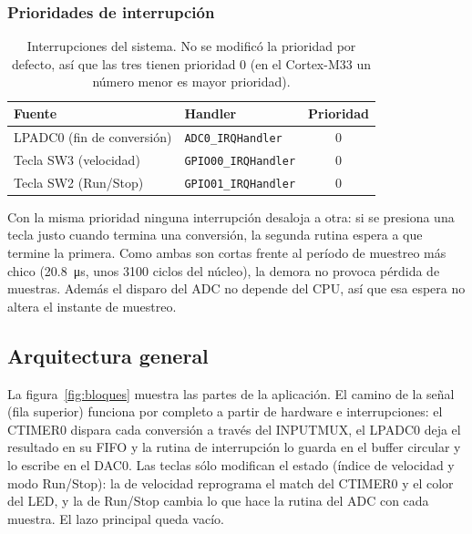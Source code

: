 \documentclass[11pt,a4paper]{article}
\begin{document}
\subsubsection{Prioridades de interrupción}

\begin{table}[H]
\centering
\caption{Interrupciones del sistema. No se modificó la prioridad por defecto,
así que las tres tienen prioridad 0 (en el Cortex-M33 un número menor es
mayor prioridad).}
\label{tab:nvic}
\begin{tabular}{@{}l l c@{}}
\toprule
\textbf{Fuente} & \textbf{Handler} & \textbf{Prioridad}\\
\midrule
LPADC0 (fin de conversión) & \texttt{ADC0\_IRQHandler}      & 0\\
Tecla SW3 (velocidad)      & \texttt{GPIO00\_IRQHandler}    & 0\\
Tecla SW2 (Run/Stop)       & \texttt{GPIO01\_IRQHandler}    & 0\\
\bottomrule
\end{tabular}
\end{table}

Con la misma prioridad ninguna interrupción desaloja a otra: si se presiona
una tecla justo cuando termina una conversión, la segunda rutina espera a que
termine la primera. Como ambas son cortas frente al período de muestreo más
chico (\qty{20.8}{\micro\second}, unos 3100 ciclos del núcleo), la demora no
provoca pérdida de muestras. Además el disparo del ADC no depende del CPU, así
que esa espera no altera el instante de muestreo.

\label{sec:diseno}

\subsection{Arquitectura general}

La figura~\ref{fig:bloques} muestra las partes de la aplicación. El camino de
la señal (fila superior) funciona por completo a partir de hardware e
interrupciones: el CTIMER0 dispara cada conversión a través del INPUTMUX, el
LPADC0 deja el resultado en su FIFO y la rutina de interrupción lo guarda en
el buffer circular y lo escribe en el DAC0. Las teclas sólo modifican el
estado (índice de velocidad y modo Run/Stop): la de velocidad reprograma el
match del CTIMER0 y el color del LED, y la de Run/Stop cambia lo que hace la
rutina del ADC con cada muestra. El lazo principal queda vacío.
\end{document}
